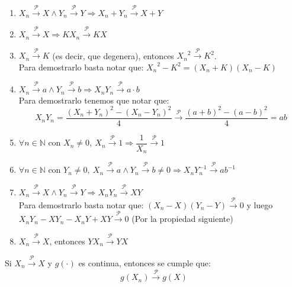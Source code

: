 \begin{enumerate}
\item $ X_n \stackrel{\mathcal{P}}{\longrightarrow} X \wedge Y_n \stackrel{\mathcal{P}}{\longrightarrow} Y \Longrightarrow X_n + Y_n \stackrel{\mathcal{P}}{\longrightarrow} X + Y$
\item $X_n \stackrel{\mathcal{P}}{\longrightarrow} X \Longrightarrow KX_n \stackrel{\mathcal{P}}{\longrightarrow} KX$
\item $X_n \stackrel{\mathcal{P}}{\longrightarrow} K$ (es decir, que degenera), entonces ${X_n}^2 \stackrel{\mathcal{P}}{\longrightarrow} K^2$.\\
Para demostrarlo basta notar que: $ {X_n}^2 - K^2 = (X_n + K) (X_n -K)$
\item $X_n \stackrel{\mathcal{P}}{\longrightarrow} a \wedge Y _n \stackrel{\mathcal{P}}{\longrightarrow} b \Longrightarrow X_nY_n \stackrel{\mathcal{P}}{\longrightarrow} a \cdot b$\\

Para demostrarlo tenemos que notar que:
$$X_n Y_n = \dfrac{(X_n + Y_n)^2-(X_n - Y_n)^2}{4}\stackrel{\mathcal{P}}{\longrightarrow} \dfrac{(a+b)^2-(a-b)^2}{4}=ab$$

\item $\forall n\in\mathbb{N}$ con $X_n\not = 0, \ X_n \stackrel{\mathcal{P}}{\longrightarrow} 1 \Longrightarrow \dfrac{1}{X_n} \stackrel{\mathcal{P}}{\longrightarrow} 1$
\item $\forall n\in\mathbb{N}$ con $Y_n\not = 0, \ X_n \stackrel{\mathcal{P}}{\longrightarrow} a \wedge Y_n \stackrel{\mathcal{P}}{\longrightarrow} b\not =0 \Longrightarrow X_nY_n^{-1}\stackrel{\mathcal{P}}{\longrightarrow} ab^{-1}$
\item $X_n \stackrel{\mathcal{P}}{\longrightarrow} X \wedge Y_n\stackrel{\mathcal{P}}{\longrightarrow} Y \Longrightarrow X_nY_n\stackrel{\mathcal{P}}{\longrightarrow} XY$\\

Para demostrarlo basta notar que: $(X_n - X)(Y_n - Y)\stackrel{\mathcal{P}}{\longrightarrow} 0$ y luego $X_nY_n-XY_n-X_nY+XY\stackrel{\mathcal{P}}{\longrightarrow} 0$ (Por la propiedad siguiente)
\item $X_n\stackrel{\mathcal{P}}{\longrightarrow} X$, entonces $YX_n\stackrel{\mathcal{P}}{\longrightarrow} YX$
\end{enumerate}

\begin{theorem}
Si $X_n\stackrel{\mathcal{P}}{\longrightarrow} X$ y $g(\cdot)$ es continua, entonces se cumple que:
$$g(X_n)\stackrel{\mathcal{P}}{\longrightarrow} g(X)$$
\end{theorem}

